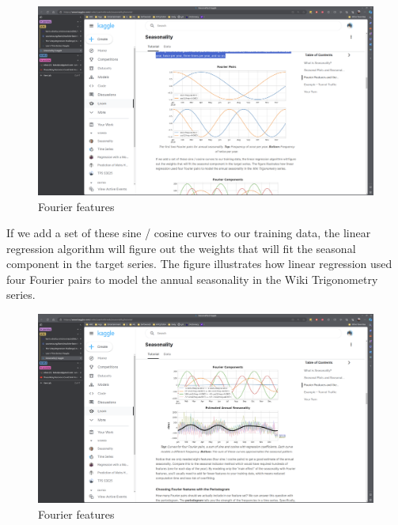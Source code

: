 \documentclass[12pt]{report}
\begin{document}
\begin{figure}[htbp]
  \begin{center}
    \includegraphics[trim =30cm 10.0cm 20cm 15cm, clip, scale=0.4]{pics/fourier.png}
    \caption{Fourier features}
    \label{default}
  \end{center}
\end{figure}

If we add a set of these sine / cosine curves to our training data, the linear regression algorithm will figure out the weights that will fit the seasonal component in the target series. The figure illustrates how linear regression used four Fourier pairs to model the annual seasonality in the Wiki Trigonometry series.

\begin{figure}[htbp]
  \begin{center}
    \includegraphics[trim =30cm 10.0cm 20cm 11cm, clip, scale=0.4]{pics/curves.png}
    \caption{Fourier features}
  \end{center}
\end{figure}
\end{document}
